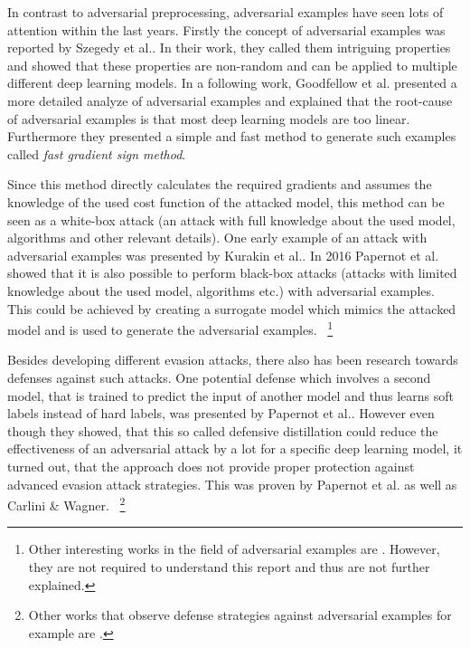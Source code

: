 \documentclass[sigconf]{acmart}
\begin{document}
In contrast to adversarial preprocessing, adversarial examples have seen lots of attention within the last years.
Firstly the concept of adversarial examples was reported by Szegedy et al.\cite{intr}.
In their work, they called them intriguing properties and showed that these properties are non-random and can be applied to multiple different deep learning models.
In a following work, Goodfellow et al.\cite{43405} presented a more detailed analyze of adversarial examples and explained that the root-cause of adversarial examples is that most deep learning models are too linear.
Furthermore they presented a simple and fast method to generate such examples called \textit{fast gradient sign method}.

Since this method directly calculates the required gradients and assumes the knowledge of the used cost function of the attacked model, this method can be seen as a white-box attack (an attack with full knowledge about the used model, algorithms and other relevant details).
One early example of an attack with adversarial examples was presented by Kurakin et al.\cite{advexinphys}.
In 2016 Papernot et al.\cite{Papernot2017PracticalBA} showed that it is also possible to perform black-box attacks (attacks with limited knowledge about the used model, algorithms etc.) with adversarial examples.
This could be achieved by creating a surrogate model which mimics the attacked model and is used to generate the adversarial examples. 
~\footnote{Other interesting works in the field of adversarial examples are \cite{8578273, brown2018adversarial, 10.1007/978-3-642-40994-3_25}. However, they are not required to understand this report and thus are not further explained.}

Besides developing different evasion attacks, there also has been research towards defenses against such attacks.
One potential defense which involves a second model, that is trained to predict the input of another model and thus learns soft labels instead of hard labels, was presented by Papernot et al.\cite{7546524}.
However even though they showed, that this so called defensive distillation could reduce the effectiveness of an adversarial attack by a lot for a specific deep learning model, it turned out, that the approach does not provide proper protection against advanced evasion attack strategies.
This was proven by Papernot et al.\cite{Papernot2017PracticalBA} as well as Carlini \& Wagner\cite{7958570}.
~\footnote{Other works that observe defense strategies against adversarial examples for example are \cite{8835364, madry2019deep}.}
\end{document}
